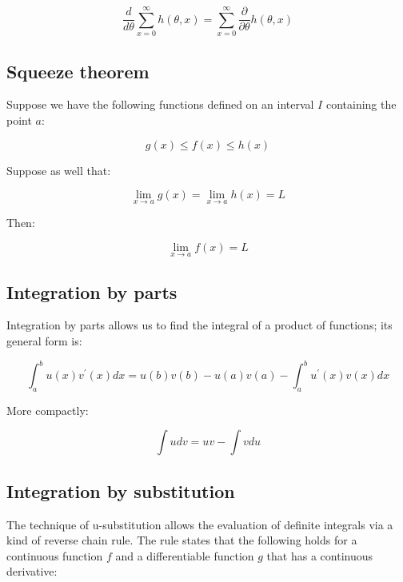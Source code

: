 \documentclass{report}
\begin{document}
\begin{equation}\label{eq:diff-under-summation}
    \frac{d}{d\theta} \sum_{x=0}^\infty h(\theta, x) = \sum_{x=0}^\infty \frac{\partial}{\partial\theta} h(\theta, x)
\end{equation}

\subsection{Squeeze theorem}

Suppose we have the following functions defined on an interval $I$ containing the point $a$:

\begin{equation}\label{eq:squeez-assumption-1}
    g(x) \le f(x) \le h(x)
\end{equation}

Suppose as well that:

\begin{equation}\label{eq:squeeze-assumption-2}
    \lim_{x\to a} g(x) = \lim_{x\to a} h(x) = L
\end{equation}

Then:

\begin{equation}\label{eq:squeeze}
    \lim_{x\to a} f(x) = L
\end{equation}

\subsection{Integration by parts}

Integration by parts allows us to find the integral of a product of functions; its general form is:

\begin{equation}\label{eq:integral-by-parts-general}
    \int_a^b u(x) v^\prime(x) dx = u(b)v(b) - u(a)v(a) - \int_a^b u^\prime(x) v(x) dx
\end{equation}

More compactly:

\begin{equation}\label{eq:integral-by-parts-simple}
   \int u dv = uv - \int v du 
\end{equation}

\subsection{Integration by substitution}

The technique of u-substitution allows the evaluation of definite integrals via a kind of reverse chain rule. The rule states that the following holds for a continuous function $f$ and a differentiable function $g$ that has a continuous derivative:
\end{document}
